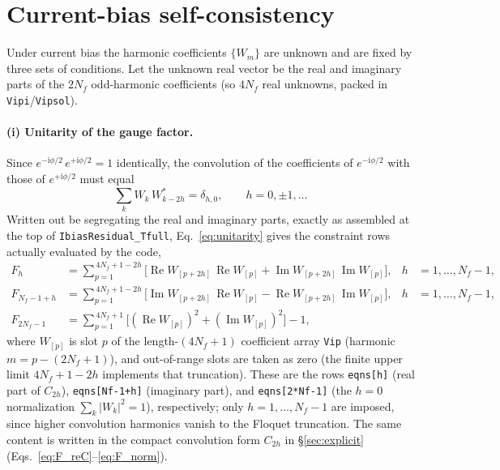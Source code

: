 \documentclass[11pt,a4paper]{article}
\newcommand{\ii}{\mathrm{i}}
\newcommand{\Real}{\operatorname{Re}}
\newcommand{\Imag}{\operatorname{Im}}
\begin{document}
\section{Current-bias self-consistency}
\label{sec:ibias}

Under current bias the harmonic coefficients $\{W_m\}$ are unknown and are
fixed by three sets of conditions.  Let the unknown real vector be the real and
imaginary parts of the $2N_f$ odd-harmonic coefficients (so $4N_f$ real
unknowns, packed in \texttt{Vipi}/\texttt{Vipsol}).

\paragraph{(i) Unitarity of the gauge factor.}
Since $e^{-\ii\phi/2}\,e^{+\ii\phi/2}=1$ identically, the convolution of the
coefficients of $e^{-\ii\phi/2}$ with those of $e^{+\ii\phi/2}$ must equal
\begin{equation}
  \sum_{k}W_{k}\,W^{*}_{k-2h} = \delta_{h,0},
  \qquad h=0,\pm1,\dots
  \label{eq:unitarity}
\end{equation}
Written out be segregating the real and imaginary parts, exactly as assembled at the top of
\texttt{IbiasResidual\_Tfull}, Eq.~\eqref{eq:unitarity} gives the constraint
rows actually evaluated by the code,
\begin{align}
  F_h &= \sum_{p=1}^{\,4N_f+1-2h}\Big[\Real W_{[p+2h]}\,\Real W_{[p]}
         + \Imag W_{[p+2h]}\,\Imag W_{[p]}\Big],
       & h&=1,\dots,N_f-1, \label{eq:code_reC}\\
  F_{N_f-1+h} &= \sum_{p=1}^{\,4N_f+1-2h}\Big[\Imag W_{[p+2h]}\,\Real W_{[p]}
         - \Real W_{[p+2h]}\,\Imag W_{[p]}\Big],
       & h&=1,\dots,N_f-1, \label{eq:code_imC}\\
  F_{2N_f-1} &= \sum_{p=1}^{\,4N_f+1}\Big[(\Real W_{[p]})^2+(\Imag W_{[p]})^2\Big]-1,
       \label{eq:code_norm}
\end{align}
where $W_{[p]}$ is slot $p$ of the length-$(4N_f+1)$ coefficient array
\texttt{Vip} (harmonic $m=p-(2N_f+1)$), and out-of-range slots are taken as zero 
(the finite upper limit $4N_f+1-2h$ implements that truncation).  These are the
rows \verb|eqns[h]| (real part of $C_{2h}$), \verb|eqns[Nf-1+h]| (imaginary part),
and \verb|eqns[2*Nf-1]| (the $h=0$ normalization $\sum_k|W_k|^2=1$), respectively;
only $h=1,\dots,N_f-1$ are imposed, since higher convolution harmonics vanish to
the Floquet truncation.  The same content is written in the compact convolution
form $C_{2h}$ in \S\ref{sec:explicit} (Eqs.~\eqref{eq:F_reC}--\eqref{eq:F_norm}).
\end{document}
